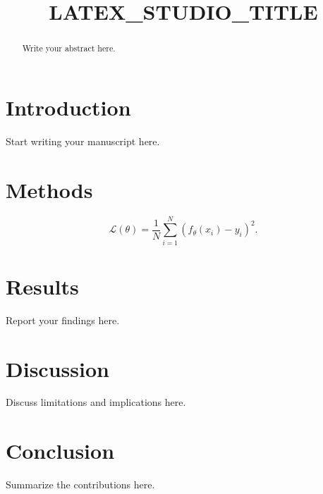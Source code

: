 \documentclass[conference]{IEEEtran}
\title{LATEX_STUDIO_TITLE}
\author{\IEEEauthorblockN{Author Name}\IEEEauthorblockA{Institution\\email@example.com}}
\begin{document}
\maketitle
\begin{abstract}
Write your abstract here.
\end{abstract}

\section{Introduction}
Start writing your manuscript here.

\section{Methods}
\begin{equation}
  \mathcal{L}(\theta) = \frac{1}{N}\sum_{i=1}^{N}(f_\theta(x_i)-y_i)^2.
  \label{eq:objective}
\end{equation}

\section{Results}
Report your findings here.

\section{Discussion}
Discuss limitations and implications here.

\section{Conclusion}
Summarize the contributions here.

% 
% 
\end{document}

